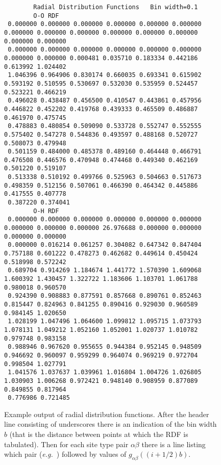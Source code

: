 \documentclass[a4paper,twoside]{report}
\newcommand{\eg}{\emph{e.g.}}
\begin{document}
\begin{figure}
\begin{tiny}
\begin{verbatim}
        Radial Distribution Functions   Bin width=0.1
        O-O RDF
 0.000000 0.000000 0.000000 0.000000 0.000000 0.000000 0.000000 0.000000 0.000000 0.000000 0.000000 0.000000 0.000000 0.000000
 0.000000 0.000000 0.000000 0.000000 0.000000 0.000000 0.000000 0.000000 0.000481 0.035710 0.183334 0.442186 0.613992 1.024402
 1.046396 0.964906 0.830174 0.660035 0.693341 0.615902 0.593192 0.510595 0.530697 0.532030 0.535959 0.524457 0.523221 0.466219
 0.496028 0.438487 0.456500 0.410547 0.443861 0.457956 0.446822 0.452202 0.419768 0.439333 0.465509 0.486887 0.461970 0.475745
 0.478883 0.480854 0.509090 0.533728 0.552747 0.552555 0.575402 0.547278 0.544836 0.493597 0.488168 0.520727 0.508073 0.479948
 0.501159 0.484000 0.485378 0.489160 0.464448 0.466791 0.476508 0.446576 0.470948 0.474468 0.449340 0.462169 0.501220 0.519107
 0.513338 0.510192 0.499766 0.525963 0.504663 0.517673 0.498359 0.512156 0.507061 0.466390 0.464342 0.445886 0.417555 0.407778
 0.387220 0.374041
        O-H RDF
 0.000000 0.000000 0.000000 0.000000 0.000000 0.000000 0.000000 0.000000 0.000000 26.976688 0.000000 0.000000 0.000000 0.000000
 0.000000 0.016214 0.061257 0.304082 0.647342 0.847404 0.757188 0.601222 0.478273 0.462682 0.449614 0.450424 0.518998 0.572242
 0.689704 0.914269 1.184674 1.441772 1.570390 1.609068 1.600392 1.430457 1.322722 1.183606 1.103701 1.061788 0.980018 0.960570
 0.924390 0.908883 0.877591 0.857668 0.890761 0.852463 0.815447 0.824963 0.841255 0.890416 0.929030 0.960589 0.984145 1.020650
 1.028199 1.047496 1.064600 1.099812 1.095715 1.073793 1.078131 1.049212 1.052160 1.052001 1.020737 1.010782 0.979748 0.983158
 0.988946 0.967620 0.955655 0.944384 0.952145 0.948509 0.946692 0.960097 0.959299 0.964074 0.969219 0.972704 0.998504 1.027791
 1.041576 1.037637 1.039961 1.016804 1.004726 1.026805 1.030903 1.006268 0.972421 0.948140 0.908959 0.877089 0.849855 0.817964
 0.776986 0.721485

\end{verbatim}
\end{tiny}
\caption[Example output of radial distribution functions.]{Example
output of radial distribution functions. After the header line
consisting of underscores there is an indication of the bin width $b$
(that is the distance between points at which the RDF is tabulated).
Then for each site type pair $\alpha\beta$ there is a line listing
which pair (\eg\ ) followed by  values of
$g_{\alpha\beta}((i+1/2)b)$.  }
\label{fig:rdf-output}
\end{figure}
\end{document}
